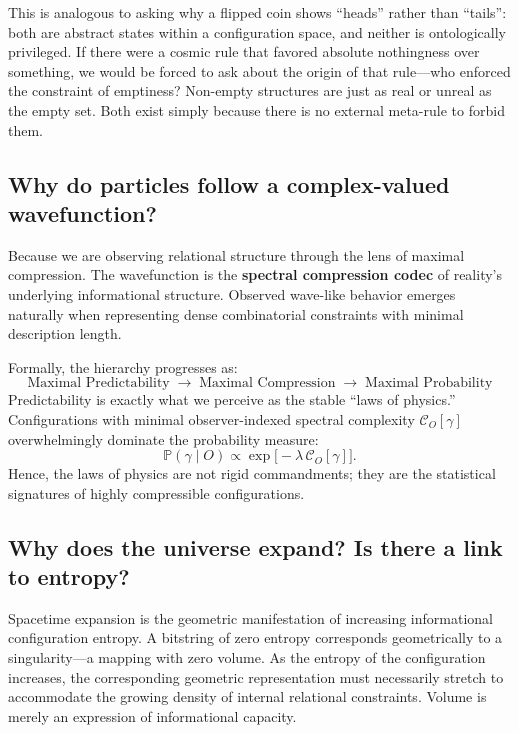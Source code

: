 This is analogous to asking why a flipped coin shows ``heads'' rather than ``tails'': both are abstract states within a configuration space, and neither is ontologically privileged.
If there were a cosmic rule that favored absolute nothingness over something, we would be forced to ask about the origin of that rule—who enforced the constraint of emptiness? Non-empty structures are just as real or unreal as the empty set.
Both exist simply because there is no external meta-rule to forbid them.


\subsection*{Why do particles follow a complex-valued wavefunction?}

Because we are observing relational structure through the lens of maximal compression.
The wavefunction is the \textbf{spectral compression codec} of reality's underlying informational structure.
Observed wave-like behavior emerges naturally when representing dense combinatorial constraints with minimal description length.

Formally, the hierarchy progresses as:
\[
\boxed{\text{Maximal Predictability}} \;\rightarrow\; \boxed{\text{Maximal Compression}} \;\rightarrow\; \boxed{\text{Maximal Probability}} 
\]
Predictability is exactly what we perceive as the stable ``laws of physics.''
Configurations with minimal observer-indexed spectral complexity $\mathcal{C}_O[\gamma]$ overwhelmingly dominate the probability measure:
\[
\mathbb{P}(\gamma \mid O) \propto \exp\bigl[-\lambda \, \mathcal{C}_O[\gamma]\bigr].
\]
Hence, the laws of physics are not rigid commandments; they are the statistical signatures of highly compressible configurations.


\subsection*{Why does the universe expand? Is there a link to entropy?}

Spacetime expansion is the geometric manifestation of increasing informational configuration entropy.
A bitstring of zero entropy corresponds geometrically to a singularity—a mapping with zero volume.
As the entropy of the configuration increases, the corresponding geometric representation must necessarily stretch to accommodate the growing density of internal relational constraints.
Volume is merely an expression of informational capacity.


